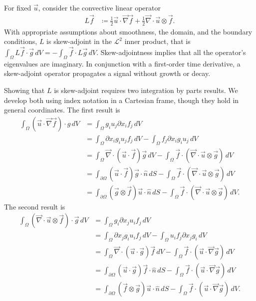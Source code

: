 \documentclass[letterpaper,reqno,11pt]{amsart}
\newcommand{\vecnabla}{\ensuremath{\vec{\nabla}}}
\begin{document}
For fixed $\vec{u}$, consider the convective linear operator
\begin{align}
  L\vec{f} &\coloneqq
      \frac{1}{2}\vec{u}\cdot\vecnabla{}\vec{f}
    + \frac{1}{2}\vecnabla\cdot\vec{u}\otimes\vec{f}.
\end{align}
With appropriate assumptions about smoothness, the domain, and the
boundary conditions, $L$ is skew-adjoint in the $\mathcal{L}^2$
inner product, that is $ \int_{\Omega} L\vec{f}\cdot\vec{g}\,d\!V =
-\int_{\Omega} \vec{f}\cdot{}L\vec{g} \,d\!V$.  Skew-adjointness implies
that all the operator's eigenvalues are imaginary.  In conjunction with a
first-order time derivative, a skew-adjoint operator propagates a signal
without growth or decay.


Showing that $L$ is skew-adjoint requires two integration by parts results.
We develop both using index notation in a Cartesian frame, though they
hold in general coordinates.  The first result is
\begin{align}
  \int_{\Omega} \left(\vec{u}\cdot\vecnabla\vec{f}\right)\cdot{g} \,d\!V
  &=
  \int_{\Omega} g_i u_j \partial\!x_{i} f_j \,d\!V
  \\
  &=
    \int_{\Omega} \partial\!x_{i} g_i u_j f_j \,d\!V
  - \int_{\Omega} f_j \partial\!x_{i} g_i u_j \,d\!V
  \\
  &=
    \int_{\Omega} \vecnabla\cdot\left(\vec{u}\cdot\vec{f}\right)\vec{g} \,d\!V
  - \int_{\Omega} \vec{f}\cdot\left(\vecnabla\cdot\vec{u}\otimes\vec{g}\right) \,d\!V
  \\
  &=
    \int_{\partial\Omega} \left(\vec{u}\cdot\vec{f}\right)\vec{g}\cdot\hat{n} \,d\!S
  - \int_{\Omega} \vec{f}\cdot\left(\vecnabla\cdot\vec{u}\otimes\vec{g}\right) \,d\!V
  \\
  &=
    \int_{\partial\Omega} \left(\vec{g}\otimes\vec{f}\right)\vec{u}\cdot\hat{n} \,d\!S
  - \int_{\Omega} \vec{f}\cdot\left(\vecnabla\cdot\vec{u}\otimes\vec{g}\right) \,d\!V
  .
\end{align}
The second result is
\begin{align}
  \int_{\Omega} \left(\vecnabla\cdot\vec{u}\otimes\vec{f}\right)\cdot\vec{g} \,d\!V
  &=
  \int_{\Omega} g_i \partial\!x_{j} u_i f_j \,d\!V
  \\
  &=
    \int_{\Omega} \partial\!x_{j} g_i u_i f_j \,d\!V
  - \int_{\Omega} u_i f_j \partial\!x_{j} g_i \,d\!V
  \\
  &=
    \int_{\Omega} \vecnabla\cdot\left(\vec{u}\cdot\vec{g}\right)\vec{f} \,d\!V
  - \int_{\Omega} \vec{f}\cdot\left(\vec{u}\cdot\vecnabla\vec{g}\right) \,d\!V
  \\
  &=
    \int_{\partial\Omega} \left(\vec{u}\cdot\vec{g}\right)\vec{f}\cdot\hat{n} \,d\!S
  - \int_{\Omega} \vec{f}\cdot\left(\vec{u}\cdot\vecnabla\vec{g}\right) \,d\!V
  \\
  &=
    \int_{\partial\Omega} \left(\vec{f}\otimes\vec{g}\right)\vec{u}\cdot\hat{n} \,d\!S
  - \int_{\Omega} \vec{f}\cdot\left(\vec{u}\cdot\vecnabla\vec{g}\right) \,d\!V
  .
\end{align}
\end{document}
